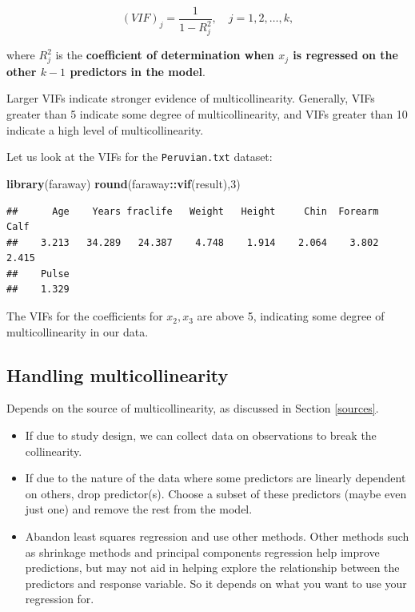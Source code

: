 \documentclass[
]{book}
\newenvironment{Shaded}{\begin{snugshade}}{\end{snugshade}}
\newcommand{\DecValTok}[1]{\textcolor[rgb]{0.00,0.00,0.81}{#1}}
\newcommand{\FunctionTok}[1]{\textcolor[rgb]{0.13,0.29,0.53}{\textbf{#1}}}
\newcommand{\NormalTok}[1]{#1}
\newcommand{\SpecialCharTok}[1]{\textcolor[rgb]{0.81,0.36,0.00}{\textbf{#1}}}
\begin{document}
\begin{equation}
\left(VIF\right)_j = \frac{1}{1-R_j^2},
\,\,\,\,\,\,j=1,2,\ldots,k,
\label{eq:7vif}
\end{equation}

where \(R_j^2\) is the \textbf{coefficient of determination when
\(x_j\) is regressed on the other \(k-1\) predictors in the model}.

Larger VIFs indicate stronger evidence of multicollinearity. Generally, VIFs greater than 5 indicate some degree of multicollinearity, and VIFs greater than 10 indicate a high level of multicollinearity.

Let us look at the VIFs for the \texttt{Peruvian.txt} dataset:

\begin{Shaded}
\begin{Highlighting}[]
\FunctionTok{library}\NormalTok{(faraway)}
\FunctionTok{round}\NormalTok{(faraway}\SpecialCharTok{::}\FunctionTok{vif}\NormalTok{(result),}\DecValTok{3}\NormalTok{)}
\end{Highlighting}
\end{Shaded}

\begin{verbatim}
##      Age    Years fraclife   Weight   Height     Chin  Forearm     Calf 
##    3.213   34.289   24.387    4.748    1.914    2.064    3.802    2.415 
##    Pulse 
##    1.329
\end{verbatim}

The VIFs for the coefficients for \(x_2, x_3\) are above 5, indicating some degree of multicollinearity in our data.

\hypertarget{handling-multicollinearity}{%
\subsection{Handling multicollinearity}\label{handling-multicollinearity}}

Depends on the source of multicollinearity, as discussed in Section \ref{sources}.

\begin{itemize}
\item
  If due to study design, we can collect data on observations to break the collinearity.
\item
  If due to the nature of the data where some predictors are linearly dependent on others, drop predictor(s). Choose a subset of these predictors (maybe even just one) and remove the rest from the model.
\item
  Abandon least squares regression and use other methods. Other methods such as shrinkage methods and principal components regression help improve predictions, but may not aid in helping explore the relationship between the predictors and response variable. So it depends on what you want to use your regression for.
\end{itemize}
\end{document}
